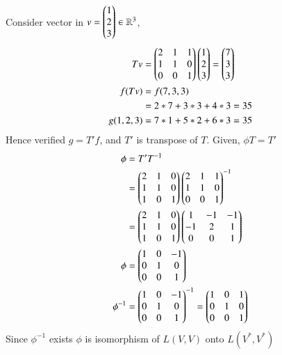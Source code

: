 \documentclass[journal,12pt,twocolumn]{IEEEtran}
\begin{document}
Consider vector in $v = \begin{pmatrix}1\\2\\3\end{pmatrix} \in \mathbb{R}^3$,
\begin{align}
	Tv &= \begin{pmatrix}2 & 1 & 1\\ 1 & 1 & 0\\ 0 & 0 & 1\end{pmatrix}\begin{pmatrix}1\\2\\3\end{pmatrix} = \begin{pmatrix}7\\3\\3\end{pmatrix}\\
	f(Tv) &= f(7,3,3)\\
	 &= 2*7 + 3*3 + 4*3 = 35\\
	 g(1,2,3) &= 7*1 + 5*2 + 6*3 = 35 
\end{align}
Hence verified $g = T'f$, and $T'$ is transpose of $T$. 
Given,  $\phi T = T'$
\begin{align}
	\phi &= T'T^{-1}\\
	&= \begin{pmatrix}2 & 1 & 0\\1 & 1 & 0\\1 & 0 & 1\end{pmatrix}\begin{pmatrix}2 & 1 & 1\\ 1 & 1 & 0\\ 0 & 0 & 1\end{pmatrix}^{-1}\\
	&= \begin{pmatrix}2 & 1 & 0\\1 & 1 & 0\\1 & 0 & 1\end{pmatrix}\begin{pmatrix}1 & -1 & -1\\-1 & 2 & 1\\0 & 0 & 1\end{pmatrix}\\
	\phi &= \begin{pmatrix}1 & 0 & -1\\0 & 1 & 0\\0 & 0 & 1\end{pmatrix}\\
	\phi^{-1} &= \begin{pmatrix}1 & 0 & -1\\0 & 1 & 0\\0 & 0 & 1\end{pmatrix}^{-1} = \begin{pmatrix}1 & 0 & 1\\0 & 1 & 0\\0 & 0 & 1\end{pmatrix}
\end{align}
Since $\phi^{-1}$ exists $\phi$ is isomorphism of $L(V,V)$ onto $L(V^*,V^*)$
\end{document}
